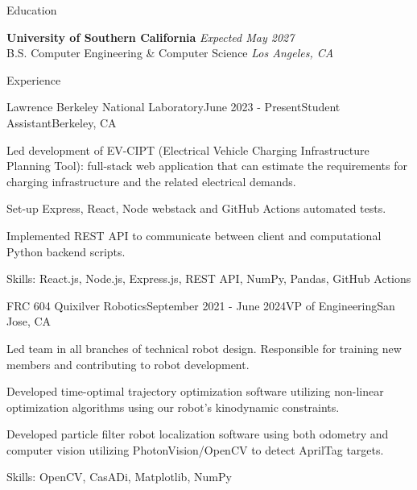 \documentclass[
	11pt, %
]{tex/resume} %
\begin{document}

\begin{rSection}{Education}
	
	\textbf{University of Southern California} \hfill \textit{Expected May 2027} \\ 
	B.S. Computer Engineering \& Computer Science \hfill \textit{Los Angeles, CA}
	
\end{rSection}


\begin{rSection}{Experience}

	\begin{rSubsection}{Lawrence Berkeley National Laboratory}{June 2023 - Present}{Student Assistant}{Berkeley, CA}
		\item Led development of EV-CIPT (Electrical Vehicle Charging Infrastructure Planning Tool): full-stack web application that can estimate the requirements for charging infrastructure and the related electrical demands.
        \item Set-up Express, React, Node webstack and GitHub Actions automated tests.
        \item Implemented REST API to communicate between client and computational Python backend scripts.
        \item Skills: React.js, Node.js, Express.js, REST API, NumPy, Pandas, GitHub Actions
        
	\end{rSubsection}


	\begin{rSubsection}{FRC 604 Quixilver Robotics}{September 2021 - June 2024}{VP of Engineering}{San Jose, CA}
		\item Led team in all branches of technical robot design. Responsible for training new members and contributing to robot development.
        \item Developed time-optimal trajectory optimization software utilizing non-linear optimization algorithms using our robot’s kinodynamic constraints.
        \item Developed particle filter robot localization software using both odometry and computer vision utilizing PhotonVision/OpenCV to detect AprilTag targets.
        \item Skills: OpenCV, CasADi, Matplotlib, NumPy
        
	\end{rSubsection}





\end{rSection}
\end{document}
